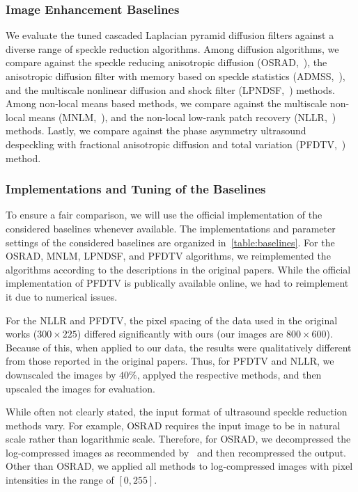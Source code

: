 \subsubsection{Image Enhancement Baselines}
We evaluate the tuned cascaded Laplacian pyramid diffusion filters against a diverse range of speckle reduction algorithms.
Among diffusion algorithms, we compare against the speckle reducing anisotropic diffusion (OSRAD,~\cite{krissian_oriented_2007}), the anisotropic diffusion filter with memory based on speckle statistics (ADMSS,~\cite{ramos-llorden_anisotropic_2015}), and the multiscale nonlinear diffusion and shock filter (LPNDSF,~\cite{zhang_multiscale_2006}) methods.
Among non-local means based methods, we compare against the multiscale non-local means (MNLM,~\cite{breivik_realtime_2017}), and the non-local low-rank patch recovery (NLLR,~\cite{zhu_nonlocal_2017}) methods.
Lastly, we compare against the phase asymmetry ultrasound despeckling with fractional anisotropic diffusion and total variation (PFDTV,~\cite{mei_phase_2020}) method.

\subsubsection{Implementations and Tuning of the Baselines}
To ensure a fair comparison, we will use the official implementation of the considered baselines whenever available.
The implementations and parameter settings of the considered baselines are organized in~\cref{table:baselines}.
For the OSRAD, MNLM, LPNDSF, and PFDTV algorithms, we reimplemented the algorithms according to the descriptions in the original papers.
While the official implementation of PFDTV is publically available online, we had to reimplement it due to numerical issues.

For the NLLR and PFDTV, the pixel spacing of the data used in the original works (\(300 \times 225\)) differed significantly with ours (our images are \(800 \times 600\)).
Because of this, when applied to our data, the results were qualitatively different from those reported in the original papers.
Thus, for PFDTV and NLLR, we downscaled the images by \(40\%\), applyed the respective methods, and then upscaled the images for evaluation.

While often not clearly stated, the input format of ultrasound speckle reduction methods vary.
For example, OSRAD requires the input image to be in natural scale rather than logarithmic scale.
Therefore, for OSRAD, we decompressed the log-compressed images as recommended by~\cite{yongjianyu_generalized_2004} and then recompressed the output.
Other than OSRAD, we applied all methods to log-compressed images with pixel intensities in the range of \([0, 255]\).

